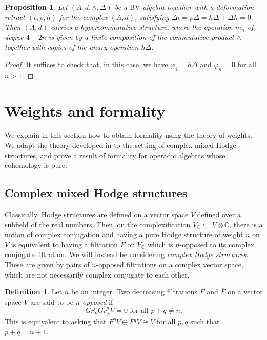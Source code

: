 \documentclass[a4paper]{amsart}
\newtheorem{prop}[theo]{Proposition}
\theoremstyle{definition}
\newtheorem{defi}[theo]{Definition}
\theoremstyle{theorem}
\newcommand{\CC}{\mathbb{C}}
\newcommand{\ov}{\overline}
\newcommand{\BV}{{\mathrm{BV}}}
\begin{document}
\begin{prop}\label{hycombigraded}
Let $(A, d,\wedge,\Delta)$ be a $\BV$-algebra together with a deformation retract $(\iota,\rho,h)$ for the complex $(A,d)$, satisfying
$\Delta \iota=\rho \Delta=h\Delta+\Delta h=0.$
Then $(A,d)$ carries a hypercommutative structure, where the operation $m_n$ of degree $4-2n$ is given by 
 a finite composition of the commutative product $\wedge$
together with copies of the unary operation $h\Delta$.
\end{prop}

\begin{proof}
It suffices to check that, in this case, we have $\varphi_1=h\Delta$ and $\varphi_n=0$ for all $n>1$.
\end{proof}



\section{Weights and formality}\label{secMHS}

We explain in this section how to obtain formality using the theory of weights.
We adapt the theory developed in \cite{CiHo} to the setting of complex mixed Hodge structures, 
and prove a result of formality for operadic algebras whose cohomology is pure.
\subsection{Complex mixed Hodge structures}

Classically, Hodge structures are defined on a vector space $V$ defined over a subfield of the real numbers.
Then, on the complexification $V_\CC:=V\otimes\CC$, there is a notion of complex conjugation
and having a pure Hodge structure of weight $n$ on $V$ is equivalent to having a filtration 
$F$ on $V_\CC$ which is $n$-opposed to its complex conjugate filtration.
We will instead be considering \textit{complex Hodge structures}. 
These are given by pairs of $n$-opposed filtrations on a complex vector space,
which are not necessarily complex conjugate to each other.

\begin{defi}Let $n$ be an integer.
Two decreasing filtrations $F$ and $\ov{F}$ on a vector space $V$ are said to be \textit{$n$-opposed} if 
\[Gr^p_FGr^q_{\ov{F}}V=0\text{ for all }p+q\neq n.\]
This is equivalent to asking that $F^pV\oplus\ov{F}{}^qV\cong V$ for all $p,q$ such that $p+q=n+1$.
\end{defi}
\end{document}
